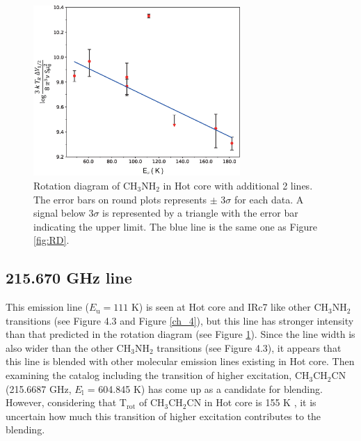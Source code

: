 \begin{figure}[htp]
  \centering
  \includegraphics[width=0.7\textwidth]{OrionKL/RD_blend.eps}
  \caption{Rotation diagram of CH$_{3}$NH$_{2}$ in Hot core with additional 2 lines. The error bars on round plots represents $\pm$ 3$\sigma$ for each data. A signal below 3$\sigma$ is represented by a triangle with the error bar indicating the upper limit. The blue line is the same one as Figure \ref{fig:RD}.}
  \label{fig:RD_blend}
\end{figure}

\subsection*{215.670 GHz line}
This emission line ($E_{\mathrm{u}}=111$ K) is seen at Hot core and IRc7 like other CH$_{3}$NH$_{2}$ transitions 
(see Figure 4.3 and Figure \ref{ch_4}), but this line has stronger intensity than that predicted in the rotation diagram (see Figure \ref{fig:RD_blend}).
Since the line width is also wider than the other CH$_{3}$NH$_{2}$ transitions (see Figure 4.3), 
it appears that this line is blended with other molecular emission lines existing in Hot core.
Then examining the catalog including the transition of higher excitation, CH$_3$CH$_2$CN (215.6687 GHz, $E_{\mathrm{l}}$ = 604.845 K)
has come up as a candidate for blending.
However, considering that T$_{\mathrm{rot}}$ of CH$_3$CH$_2$CN in Hot core is 155 K \citep{Feng+2015}, 
it is uncertain how much this transition of higher excitation contributes to the blending.

